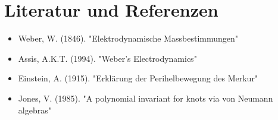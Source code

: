 \documentclass{article}
\begin{document}
\section{Literatur und Referenzen}
\begin{itemize}
    \item Weber, W. (1846). "Elektrodynamische Massbestimmungen"
    \item Assis, A.K.T. (1994). "Weber's Electrodynamics"
    \item Einstein, A. (1915). "Erklärung der Perihelbewegung des Merkur"
    \item Jones, V. (1985). "A polynomial invariant for knots via von Neumann algebras"
\end{itemize}
\end{document}
